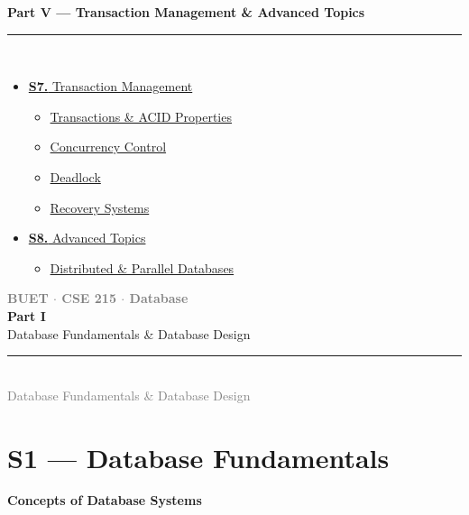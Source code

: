 \documentclass[12pt,a3paper]{article}
\newcommand{\subtopic}[2]{%
  \vspace{10pt}
  \noindent\begin{tcolorbox}[colback=#1!8,colframe=#1,boxrule=0.6pt,arc=4pt,
    left=6pt,right=6pt,top=4pt,bottom=4pt]
    \small\bfseries\textcolor{#1}{#2}
  \end{tcolorbox}
  \vspace{2pt}
}
\newcommand{\secdivider}[4]{%
  \newpage\thispagestyle{empty}%
  \vspace*{\fill}%
  \begin{tcolorbox}[enhanced,colback=#4!7,colframe=#3,boxrule=1.5pt,arc=8pt,
    left=20pt,right=20pt,top=22pt,bottom=22pt,
    shadow={3pt}{-3pt}{0pt}{black!15}]
    \centering
    {\large\textcolor{gray}{\textbf{BUET $\cdot$ CSE 215 $\cdot$ Database}}}\\[8pt]
    {\fontsize{26}{32}\selectfont\bfseries\textcolor{#3}{#1}}\\[6pt]
    {\fontsize{15}{19}\selectfont\textcolor{dgray}{#2}}\\[12pt]
    \textcolor{#3!60}{\rule{0.5\textwidth}{0.5pt}}\\[6pt]
    {\small\textcolor{gray}{#2}}
  \end{tcolorbox}%
  \vspace*{\fill}\newpage%
}
\begin{document}
\begin{tcolorbox}[breakable,colback=cE!5,colframe=cE,boxrule=1pt,arc=5pt,
  left=8pt,right=8pt,top=8pt,bottom=8pt,before skip=4pt]
  {\large\bfseries\textcolor{cE}{Part V --- Transaction Management \& Advanced Topics}}\\[5pt]
  \textcolor{cE!40}{\rule{\textwidth}{0.4pt}}\\[3pt]
  \small\begin{itemize}[leftmargin=1.2em,itemsep=1pt,label={\textcolor{cE}{$\triangleright$}}]
    \item \hyperref[sec:S7]{\textbf{S7.} Transaction Management}
      \begin{itemize}[leftmargin=1.5em,itemsep=0pt,label={\textcolor{cE}{$\cdot$}}]
        \item \hyperref[sub:s7-acid]{Transactions \& ACID Properties}
        \item \hyperref[sub:s7-cc]{Concurrency Control}
        \item \hyperref[sub:s7-deadlock]{Deadlock}
        \item \hyperref[sub:s7-recovery]{Recovery Systems}
      \end{itemize}
    \item \hyperref[sec:S8]{\textbf{S8.} Advanced Topics}
      \begin{itemize}[leftmargin=1.5em,itemsep=0pt,label={\textcolor{cE}{$\cdot$}}]
        \item \hyperref[sub:s8-dist]{Distributed \& Parallel Databases}
      \end{itemize}
  \end{itemize}
\end{tcolorbox}

\newpage

\secdivider{Part I}{Database Fundamentals \& Database Design}{cA}{cA}

\section{S1 --- Database Fundamentals}
\label{sec:S1}

\subtopic{cA}{Concepts of Database Systems}
\label{sub:s1-concepts}
\end{document}
